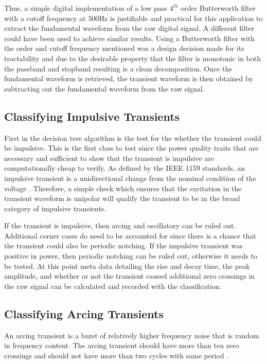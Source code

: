 \documentclass[10pt,conference,compsocconf]{IEEEtran}
\begin{document}
Thus, a simple digital implementation of a low pass $4^{th}$ order Butterworth filter with a cutoff frequency at $500$Hz is justifiable and practical for this application to extract the fundamental waveform from the raw digital signal. A different filter could have been used to achieve similar results. Using a Butterworth filter with the order and cutoff frequency mentioned was a design decision made for its tractability and due to the desirable property that the filter is monotonic in both the passband and stopband resulting is a clean decomposition. Once the fundamental waveform is retrieved, the transient waveform is then obtained by subtracting out the fundamental waveform from the raw signal.

\subsection{Classifying Impulsive Transients}

First in the decision tree algorithm is the test for the whether the transient could be impulsive. This is the first class to test since the power quality traits that are necessary and sufficient to show that the transient is impulsive are computationally cheap to verify. As defined by the IEEE 1159 standards, an impulsive transient is a unidirectional change from the nominal condition of the voltage \cite{IEEE:2018:1159D3}. Therefore, a simple check which ensures that the excitation in the transient waveform is unipolar will qualify the transient to be in the broad category of impulsive transients. 

If the transient is impulsive, then arcing and oscillatory can be ruled out. Additional corner cases do need to be accounted for since there is a chance that the transient could also be periodic notching. If the impulsive transient was positive in power, then periodic notching can be ruled out, otherwise it needs to be tested. At this point meta data detailing the rise and decay time, the peak amplitude, and whether or not the transient caused additional zero crossings in the raw signal can be calculated and recorded with the classification. 

\subsection{Classifying Arcing Transients}

An arcing transient is a burst of relatively higher frequency noise that is random in frequency content. The arcing transient should have more than ten zero crossings and should not have more than two cycles with same period \cite{IEEE:2018:1159D3}. 
\end{document}
